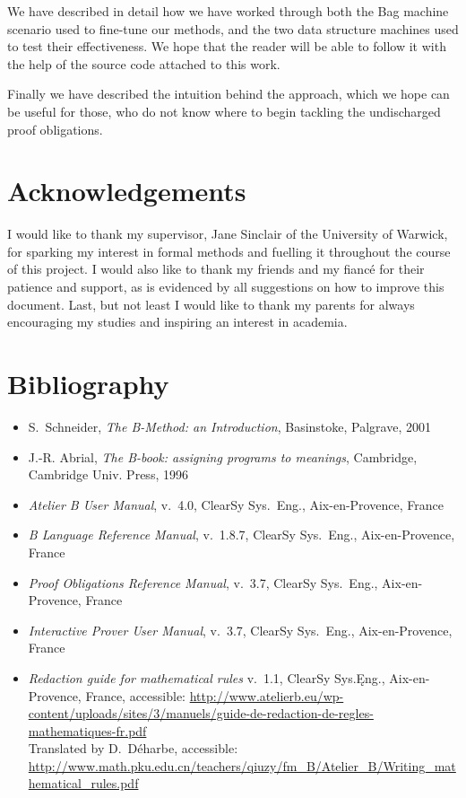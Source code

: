 \documentclass[12pt,journal,duplex]{IEEEtran}
\begin{document}
	We have described in detail how we have worked through both the Bag machine scenario used to fine-tune our methods, and the two data structure machines used to test their effectiveness. We hope that the reader will be able to follow it with the help of the source code attached to this work.

	Finally we have described the intuition behind the approach, which we hope can be useful for those, who do not know where to begin tackling the undischarged proof obligations.

	\section{Acknowledgements}
	I would like to thank my supervisor, Jane Sinclair of the University of Warwick, for sparking my interest in formal methods and fuelling it throughout the course of this project. I would also like to thank my friends and my fianc\'{e} for their patience and support, as is evidenced by all suggestions on how to improve this document. Last, but not least I would like to thank my parents for always encouraging my studies and inspiring an interest in academia.

	\IEEEPARstart{}{}
	\newpage

\pagebreak
	\section*{Bibliography}
	\begin{itemize}
		\item
		S.~Schneider, \emph{The B-Method: an Introduction}, Basinstoke, Palgrave, 2001

		\item
		J.-R. Abrial, \emph{The B-book: assigning programs to meanings}, Cambridge, Cambridge Univ. Press, 1996

		\item
		\emph{Atelier B User Manual}, v.~4.0, ClearSy Sys.~Eng., Aix-en-Provence, France

		\item
		\emph{B Language Reference Manual}, v.~1.8.7, ClearSy Sys.~Eng., Aix-en-Provence, France

		\item
		\emph{Proof Obligations Reference Manual}, v.~3.7, ClearSy Sys.~Eng., Aix-en-Provence, France

		\item
		\emph{Interactive Prover User Manual}, v.~3.7, ClearSy Sys.~Eng., Aix-en-Provence, France

		\item
		\emph{Redaction guide for mathematical rules} v.~1.1, ClearSy Sys.Ęng., Aix-en-Provence, France, accessible: \url{http://www.atelierb.eu/wp-content/uploads/sites/3/manuels/guide-de-redaction-de-regles-mathematiques-fr.pdf}\\
		Translated by D.~D\'{e}harbe, accessible:
		\url{http://www.math.pku.edu.cn/teachers/qiuzy/fm_B/Atelier_B/Writing_mathematical_rules.pdf}
	\end{itemize}
\end{document}
